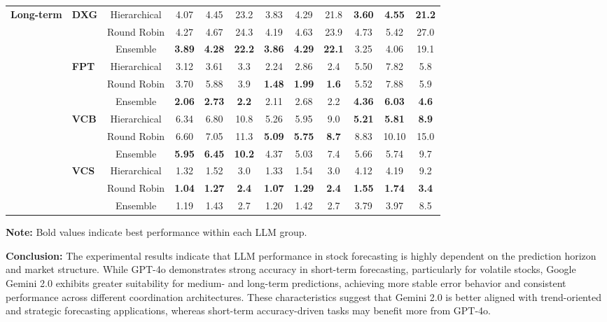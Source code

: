 \documentclass{ieeeaccess}
\begin{document}
\begin{table}[!h]
\begin{tabular}{llcccc|ccc|ccc}
\multirow{12}{*}{\textbf{Long-term}}
& \multirow{3}{*}{\textbf{DXG}} & Hierarchical & 4.07 & 4.45 & 23.2 & 3.83 & 4.29 & 21.8 & \textbf{3.60} & \textbf{4.55} & \textbf{21.2} \\
& & Round Robin & 4.27 & 4.67 & 24.3 & 4.19 & 4.63 & 23.9 & 4.73 & 5.42 & 27.0 \\
& & Ensemble & \textbf{3.89} & \textbf{4.28} & \textbf{22.2} & \textbf{3.86} & \textbf{4.29} & \textbf{22.1} & 3.25 & 4.06 & 19.1 \\
& \multirow{3}{*}{\textbf{FPT}} & Hierarchical & 3.12 & 3.61 & 3.3 & 2.24 & 2.86 & 2.4 & 5.50 & 7.82 & 5.8 \\
& & Round Robin & 3.70 & 5.88 & 3.9 & \textbf{1.48} & \textbf{1.99} & \textbf{1.6} & 5.52 & 7.88 & 5.9 \\
& & Ensemble & \textbf{2.06} & \textbf{2.73} & \textbf{2.2} & 2.11 & 2.68 & 2.2 & \textbf{4.36} & \textbf{6.03} & \textbf{4.6} \\
& \multirow{3}{*}{\textbf{VCB}} & Hierarchical & 6.34 & 6.80 & 10.8 & 5.26 & 5.95 & 9.0 & \textbf{5.21} & \textbf{5.81} & \textbf{8.9} \\
& & Round Robin & 6.60 & 7.05 & 11.3 & \textbf{5.09} & \textbf{5.75} & \textbf{8.7} & 8.83 & 10.10 & 15.0 \\
& & Ensemble & \textbf{5.95} & \textbf{6.45} & \textbf{10.2} & 4.37 & 5.03 & 7.4 & 5.66 & 5.74 & 9.7 \\
& \multirow{3}{*}{\textbf{VCS}} & Hierarchical & 1.32 & 1.52 & 3.0 & 1.33 & 1.54 & 3.0 & 4.12 & 4.19 & 9.2 \\
& & Round Robin & \textbf{1.04} & \textbf{1.27} & \textbf{2.4} & \textbf{1.07} & \textbf{1.29} & \textbf{2.4} & \textbf{1.55} & \textbf{1.74} & \textbf{3.4} \\
& & Ensemble & 1.19 & 1.43 & 2.7 & 1.20 & 1.42 & 2.7 & 3.79 & 3.97 & 8.5 \\

\bottomrule
\end{tabular}

\vspace{0.3cm}
\footnotesize
\textbf{Note:} Bold values indicate best performance within each LLM group.
\end{table}

\noindent\textbf{Conclusion:} The experimental results indicate that LLM performance in stock forecasting is highly dependent on the prediction horizon and market structure. While GPT-4o demonstrates strong accuracy in short-term forecasting, particularly for volatile stocks, Google Gemini 2.0 exhibits greater suitability for medium- and long-term predictions, achieving more stable error behavior and consistent performance across different coordination architectures. These characteristics suggest that Gemini 2.0 is better aligned with trend-oriented and strategic forecasting applications, whereas short-term accuracy-driven tasks may benefit more from GPT-4o.
\newpage
\twocolumn
\end{document}
